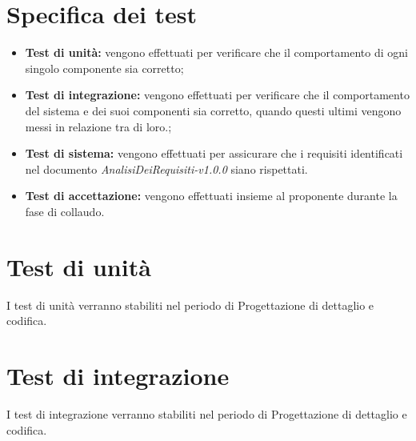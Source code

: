 \section{Specifica dei test}

\begin{itemize}
    \item \textbf{Test di unità:} vengono effettuati per verificare che il comportamento di ogni singolo componente sia corretto;
    \item \textbf{Test di integrazione:} vengono effettuati per verificare che il comportamento del sistema e dei suoi componenti sia corretto, quando questi ultimi vengono messi in relazione tra di loro.;
    \item \textbf{Test di sistema:} vengono effettuati per assicurare che i requisiti identificati nel documento \textit{AnalisiDeiRequisiti-v1.0.0} siano rispettati.
    \item \textbf{Test di accettazione:} vengono effettuati insieme al proponente durante la fase di collaudo.
\end{itemize}
\section{Test di unità}
I test di unità verranno stabiliti nel periodo di Progettazione di dettaglio e codifica.

\section{Test di integrazione}
I test di integrazione verranno stabiliti nel periodo di Progettazione di dettaglio e codifica.

